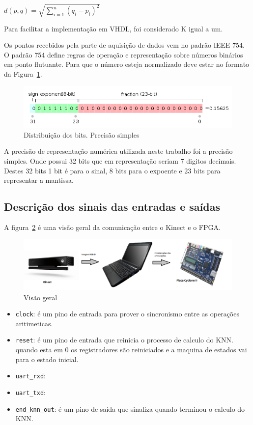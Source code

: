 \documentclass[12pt]{article}
\begin{document}
$d(p, q) = \sqrt{\sum\limits_{i=1}^n (q_i - p_i)^2}$

Para facilitar a implementação em VHDL, foi considerado K igual a um. 

Os pontos recebidos pela parte de aquisição de dados vem no padrão IEEE 754. O
padrão 754 define regras de operação e representação sobre números binários em
ponto flutuante. Para que o número esteja normalizado deve estar no formato da
Figura~\ref{fig:ieee754ps}.

\begin{figure}[h]
\centering
\includegraphics[width=.5\textwidth]{img/IEEE_754_Single_Floating_Point_Format}
\caption{Distribuição dos bits. Precisão simples \cite{wiki:ieee754en}}
\label{fig:ieee754ps}
\end{figure}

A precisão de representação numérica utilizada neste trabalho foi a precisão 
simples. Onde possui 32 bits que em representação seriam 7 digitos decimais.
Destes 32 bits 1 bit é para o sinal, 8 bits para o expoente e 23 bits para 
representar a mantissa.

\subsection{Descrição dos sinais das entradas e saídas}

A figura~\ref{fig:visaogeral} é uma visão geral da comunicação entre o Kinect e
o FPGA.

\begin{figure}[h]
\centering
\includegraphics[width=.5\textwidth]{img/visao_geral}
\caption{Visão geral}
\label{fig:visaogeral}
\end{figure}


\begin{itemize}

\item \verb|clock|: é um pino de entrada para prover o sincronismo entre as
operações aritimeticas.

\item \verb|reset|: é um pino de entrada que reinicia o processo de calculo do
KNN. quando esta em 0 os registradores são reiniciados e a maquina de estados
vai para o estado inicial.

\item \verb|uart_rxd|:

\item \verb|uart_txd|:

\item \verb|end_knn_out|: é um pino de saída que sinaliza quando 
terminou o calculo do KNN.


\end{itemize}
\end{document}

